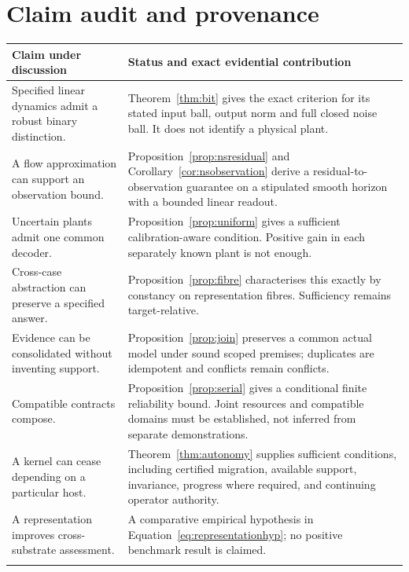 \documentclass[11pt,a4paper]{article}
\theoremstyle{definition}
\theoremstyle{remark}
\begin{document}
\Needspace{0.18\textheight}

\section{Claim audit and provenance}\label{app:audit}
\begingroup\small
\begin{longtable}{@{}>{\raggedright\arraybackslash}p{}>{\raggedright\arraybackslash}p{}@{}}
\toprule
Claim under discussion & Status and exact evidential contribution \\\midrule
\endhead
Specified linear dynamics admit a robust binary distinction. & Theorem~\ref{thm:bit} gives the exact criterion for its stated input ball, output norm and full closed noise ball. It does not identify a physical plant. \\\addlinespace
A flow approximation can support an observation bound. & Proposition~\ref{prop:nsresidual} and Corollary~\ref{cor:nsobservation} derive a residual-to-observation guarantee on a stipulated smooth horizon with a bounded linear readout. \\\addlinespace
Uncertain plants admit one common decoder. & Proposition~\ref{prop:uniform} gives a sufficient calibration-aware condition. Positive gain in each separately known plant is not enough. \\\addlinespace
Cross-case abstraction can preserve a specified answer. & Proposition~\ref{prop:fibre} characterises this exactly by constancy on representation fibres. Sufficiency remains target-relative. \\\addlinespace
Evidence can be consolidated without inventing support. & Proposition~\ref{prop:join} preserves a common actual model under sound scoped premises; duplicates are idempotent and conflicts remain conflicts. \\\addlinespace
Compatible contracts compose. & Proposition~\ref{prop:serial} gives a conditional finite reliability bound. Joint resources and compatible domains must be established, not inferred from separate demonstrations. \\\addlinespace
A kernel can cease depending on a particular host. & Theorem~\ref{thm:autonomy} supplies sufficient conditions, including certified migration, available support, invariance, progress where required, and continuing operator authority. \\\addlinespace
A representation improves cross-substrate assessment. & A comparative empirical hypothesis in Equation~\eqref{eq:representationhyp}; no positive benchmark result is claimed. \\\addlinespace

\end{longtable}
\end{document}
